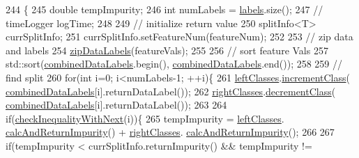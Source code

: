 \begin{DoxyCode}
244                                                                                        \{
245                     \textcolor{keywordtype}{double} tempImpurity;
246                     \textcolor{keywordtype}{int} numLabels = \hyperlink{classfp_1_1split_a9658b163c2cd30e9900e21c3b1c3f2f9}{labels}.size();
247                 \textcolor{comment}{//  timeLogger logTime;}
248 
249                     \textcolor{comment}{// initialize return value}
250                     splitInfo<T> currSplitInfo;
251                     currSplitInfo.setFeatureNum(featureNum);
252 
253                     \textcolor{comment}{// zip data and labels}
254                     \hyperlink{classfp_1_1split_a7b34c093da10d549e3750c641dfa991d}{zipDataLabels}(featureVals);
255 
256                     \textcolor{comment}{// sort feature Vals}
257                     std::sort(\hyperlink{classfp_1_1split_ac8f54cf4a42335814e10e351c49e3c32}{combinedDataLabels}.begin(), 
      \hyperlink{classfp_1_1split_ac8f54cf4a42335814e10e351c49e3c32}{combinedDataLabels}.end());
258 
259                     \textcolor{comment}{// find split}
260                     \textcolor{keywordflow}{for}(\textcolor{keywordtype}{int} i=0; i<numLabels-1; ++i)\{
261                         \hyperlink{classfp_1_1split_a3be6dcf32281715e6376e9f5f8da18f0}{leftClasses}.\hyperlink{classfp_1_1classTotals_aa05c13b36638adc361d638559c43a447}{incrementClass}(
      \hyperlink{classfp_1_1split_ac8f54cf4a42335814e10e351c49e3c32}{combinedDataLabels}[i].returnDataLabel());
262                         \hyperlink{classfp_1_1split_af5366297f7de9b8ff0911186300bab7e}{rightClasses}.\hyperlink{classfp_1_1classTotals_af388dc1e664488603f7834da2f097a06}{decrementClass}(
      \hyperlink{classfp_1_1split_ac8f54cf4a42335814e10e351c49e3c32}{combinedDataLabels}[i].returnDataLabel());
263 
264                         \textcolor{keywordflow}{if}(\hyperlink{classfp_1_1split_ac75c6034210f3c53ff3435e2d12377e1}{checkInequalityWithNext}(i))\{
265                             tempImpurity = \hyperlink{classfp_1_1split_a3be6dcf32281715e6376e9f5f8da18f0}{leftClasses}.
      \hyperlink{classfp_1_1classTotals_a94eaf5d719442de6f7014b0630932bb8}{calcAndReturnImpurity}() + \hyperlink{classfp_1_1split_af5366297f7de9b8ff0911186300bab7e}{rightClasses}.
      \hyperlink{classfp_1_1classTotals_a94eaf5d719442de6f7014b0630932bb8}{calcAndReturnImpurity}();
266                             
267                             \textcolor{keywordflow}{if}(tempImpurity < currSplitInfo.returnImpurity() && tempImpurity != 

\end{DoxyCode}

